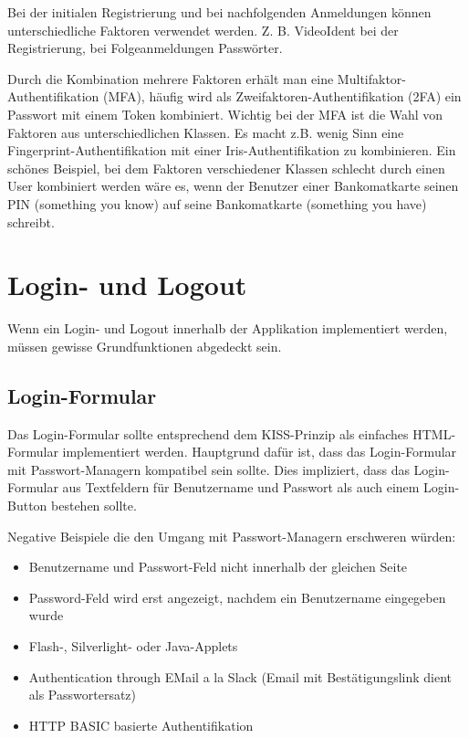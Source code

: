 Bei der initialen Registrierung und bei nachfolgenden Anmeldungen können unterschiedliche Faktoren verwendet werden. Z. B. VideoIdent bei der Registrierung, bei Folgeanmeldungen Passwörter.

Durch die Kombination mehrere Faktoren erhält man eine Multifaktor-Authentifikation (MFA), häufig wird als Zweifaktoren-Authentifikation (2FA) ein Passwort mit einem Token kombiniert. Wichtig bei der MFA ist die Wahl von Faktoren aus unterschiedlichen Klassen. Es macht z.B. wenig Sinn eine Fingerprint-Authentifikation mit einer Iris-Authentifikation zu kombinieren. Ein schönes Beispiel, bei dem Faktoren verschiedener Klassen schlecht durch einen User kombiniert werden wäre es, wenn der Benutzer einer Bankomatkarte seinen PIN (something you know) auf seine Bankomatkarte (something you have) schreibt.

\section{Login- und Logout}

Wenn ein Login- und Logout innerhalb der Applikation implementiert werden, müssen gewisse Grundfunktionen abgedeckt sein.

\subsection{Login-Formular}

Das Login-Formular sollte entsprechend dem KISS-Prinzip als einfaches HTML-Formular implementiert werden. Hauptgrund dafür ist, dass das Login-Formular mit Passwort-Managern kompatibel sein sollte. Dies impliziert, dass das Login-Formular aus Textfeldern für Benutzername und Passwort als auch einem Login-Button bestehen sollte.

Negative Beispiele die den Umgang mit Passwort-Managern erschweren würden:

\begin{itemize}
	\item Benutzername und Passwort-Feld nicht innerhalb der gleichen Seite
	\item Password-Feld wird erst angezeigt, nachdem ein Benutzername eingegeben wurde
	\item Flash-, Silverlight- oder Java-Applets
	\item Authentication through EMail a la Slack (Email mit Bestätigungslink dient als Passwortersatz)
	\item HTTP BASIC basierte Authentifikation
\end{itemize}

